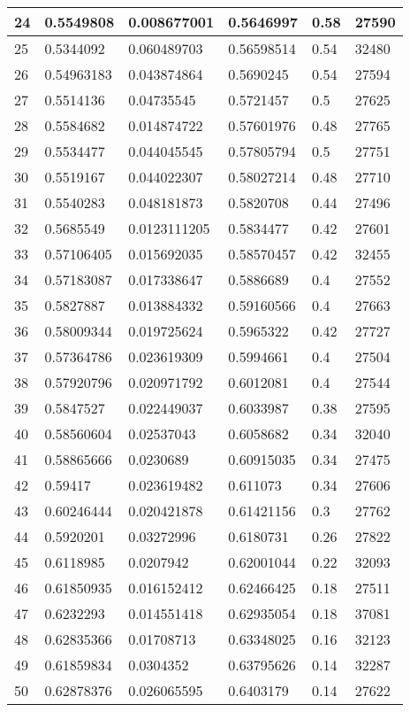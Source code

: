 \begin{longtable}{|l|l|l|l|l|l|}
24 & 0.5549808 & 0.008677001 & 0.5646997 & 0.58 & 27590 \\ \hline 
25 & 0.5344092 & 0.060489703 & 0.56598514 & 0.54 & 32480 \\ \hline 
26 & 0.54963183 & 0.043874864 & 0.5690245 & 0.54 & 27594 \\ \hline 
27 & 0.5514136 & 0.04735545 & 0.5721457 & 0.5 & 27625 \\ \hline 
28 & 0.5584682 & 0.014874722 & 0.57601976 & 0.48 & 27765 \\ \hline 
29 & 0.5534477 & 0.044045545 & 0.57805794 & 0.5 & 27751 \\ \hline 
30 & 0.5519167 & 0.044022307 & 0.58027214 & 0.48 & 27710 \\ \hline 
31 & 0.5540283 & 0.048181873 & 0.5820708 & 0.44 & 27496 \\ \hline 
32 & 0.5685549 & 0.0123111205 & 0.5834477 & 0.42 & 27601 \\ \hline 
33 & 0.57106405 & 0.015692035 & 0.58570457 & 0.42 & 32455 \\ \hline 
34 & 0.57183087 & 0.017338647 & 0.5886689 & 0.4 & 27552 \\ \hline 
35 & 0.5827887 & 0.013884332 & 0.59160566 & 0.4 & 27663 \\ \hline 
36 & 0.58009344 & 0.019725624 & 0.5965322 & 0.42 & 27727 \\ \hline 
37 & 0.57364786 & 0.023619309 & 0.5994661 & 0.4 & 27504 \\ \hline 
38 & 0.57920796 & 0.020971792 & 0.6012081 & 0.4 & 27544 \\ \hline 
39 & 0.5847527 & 0.022449037 & 0.6033987 & 0.38 & 27595 \\ \hline 
40 & 0.58560604 & 0.02537043 & 0.6058682 & 0.34 & 32040 \\ \hline 
41 & 0.58865666 & 0.0230689 & 0.60915035 & 0.34 & 27475 \\ \hline 
42 & 0.59417 & 0.023619482 & 0.611073 & 0.34 & 27606 \\ \hline 
43 & 0.60246444 & 0.020421878 & 0.61421156 & 0.3 & 27762 \\ \hline 
44 & 0.5920201 & 0.03272996 & 0.6180731 & 0.26 & 27822 \\ \hline 
45 & 0.6118985 & 0.0207942 & 0.62001044 & 0.22 & 32093 \\ \hline 
46 & 0.61850935 & 0.016152412 & 0.62466425 & 0.18 & 27511 \\ \hline 
47 & 0.6232293 & 0.014551418 & 0.62935054 & 0.18 & 37081 \\ \hline 
48 & 0.62835366 & 0.01708713 & 0.63348025 & 0.16 & 32123 \\ \hline 
49 & 0.61859834 & 0.0304352 & 0.63795626 & 0.14 & 32287 \\ \hline 
50 & 0.62878376 & 0.026065595 & 0.6403179 & 0.14 & 27622 \\ \hline 
\end{longtable}